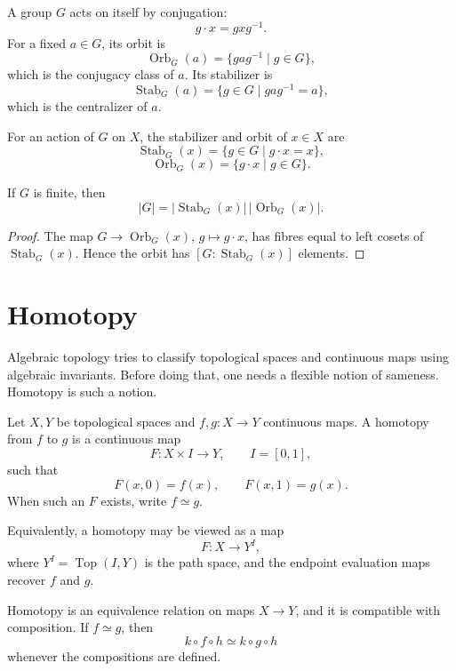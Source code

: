 \begin{example}[Conjugation]
A group \(G\) acts on itself by conjugation:
\[
  g\cdot x=gxg^{-1}.
\]
For a fixed \(a\in G\), its orbit is
\[
  \operatorname{Orb}_G(a)=\{gag^{-1}\mid g\in G\},
\]
which is the conjugacy class of \(a\).  Its stabilizer is
\[
  \operatorname{Stab}_G(a)=\{g\in G\mid gag^{-1}=a\},
\]
which is the centralizer of \(a\).
\end{example}

\begin{definition}
For an action of \(G\) on \(X\), the stabilizer and orbit of \(x\in X\) are
\[
  \operatorname{Stab}_G(x)=\{g\in G\mid g\cdot x=x\},
\]
\[
  \operatorname{Orb}_G(x)=\{g\cdot x\mid g\in G\}.
\]
\end{definition}

\begin{theorem}
If \(G\) is finite, then
\[
  |G|=|\operatorname{Stab}_G(x)|\,|\operatorname{Orb}_G(x)|.
\]
\end{theorem}

\begin{proof}
The map \(G\to\operatorname{Orb}_G(x)\), \(g\mapsto g\cdot x\), has fibres equal to left cosets of \(\operatorname{Stab}_G(x)\).  Hence the orbit has \([G:\operatorname{Stab}_G(x)]\) elements.
\end{proof}

\section{Homotopy}

Algebraic topology tries to classify topological spaces and continuous maps using algebraic invariants.  Before doing that, one needs a flexible notion of sameness.  Homotopy is such a notion.

\begin{definition}
Let \(X,Y\) be topological spaces and \(f,g:X\to Y\) continuous maps.  A homotopy from \(f\) to \(g\) is a continuous map
\[
  F:X\times I\to Y,\qquad I=[0,1],
\]
such that
\[
  F(x,0)=f(x),\qquad F(x,1)=g(x).
\]
When such an \(F\) exists, write \(f\simeq g\).
\end{definition}

Equivalently, a homotopy may be viewed as a map
\[
  F:X\to Y^I,
\]
where \(Y^I=\operatorname{Top}(I,Y)\) is the path space, and the endpoint evaluation maps recover \(f\) and \(g\).

\begin{proposition}
Homotopy is an equivalence relation on maps \(X\to Y\), and it is compatible with composition.  If \(f\simeq g\), then
\[
  k\circ f\circ h\simeq k\circ g\circ h
\]
whenever the compositions are defined.
\end{proposition}

